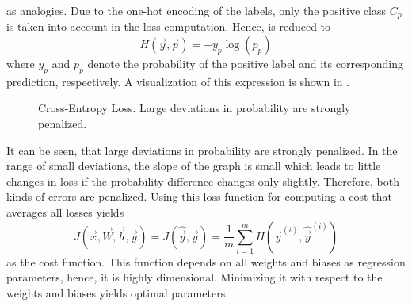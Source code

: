 as analogies.
Due to the one-hot encoding of the labels, only the positive class $C_p$ is taken into account in the loss computation.
Hence,  is reduced to
\begin{equation}
	\label{eq:cross-entropy-loss-compact}
	H(\vec{y}, \vec{p}) = - y_p \log (p_p)
\end{equation}
where $y_p$ and $p_p$ denote the probability of the positive label and its corresponding prediction, respectively.
A visualization of this expression is shown in .
\begin{figure}
	\setlength{}
	\setlength{}
	\centering
	
	\caption[Cross-Entropy Loss]{Cross-Entropy Loss. Large deviations in probability are strongly penalized.}
	\label{fig:cross-entropy}
\end{figure}
It can be seen, that large deviations in probability are strongly penalized.
In the range of small deviations, the slope of the graph is small which leads to little changes in loss if the probability difference changes only slightly.
Therefore, both kinds of errors are penalized.
Using this loss function for computing a cost that averages all losses yields
\begin{equation}
	\label{eq:cross-entropy-cost}
	J(\vec{x}, \vec{W}, \vec{b}, \vec{y}) = J(\hat{\vec{y}}, \vec{y}) = \frac{1}{m} \sum_{i=1}^{m} H(\vec{y}^{(i)}, \hat{\vec{y}}^{(i)})
\end{equation}
as the cost function.
This function depends on all weights and biases as regression parameters, hence, it is highly dimensional.
Minimizing it with respect to the weights and biases yields optimal parameters.